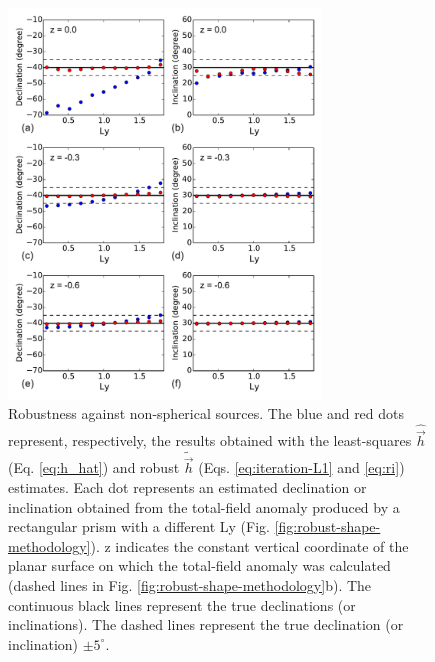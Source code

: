 \documentclass[journal abbreviation, npg]{copernicus}
\begin{document}
\begin{figure}[t]
\vspace*{2mm}
\begin{center}
\includegraphics[width=8.3cm]{Figures/Fig6.pdf}
\end{center}
\caption{Robustness against non-spherical sources. The blue and red dots represent, respectively, the results obtained with the least-squares $\hat{\vec{h}}$ (Eq. \ref{eq:h_hat}) and robust $\tilde{\vec{h}}$ (Eqs. \ref{eq:iteration-L1} and \ref{eq:ri}) estimates. Each dot represents an estimated declination or inclination obtained from the total-field anomaly produced by a rectangular prism with a different Ly (Fig. \ref{fig:robust-shape-methodology}). z indicates the constant vertical coordinate of the planar surface on which the total-field anomaly was calculated (dashed lines in Fig. \ref{fig:robust-shape-methodology}b). The continuous black lines represent the true declinations (or inclinations). The dashed lines represent the true declination (or inclination) $\pm 5^{\circ}$.} 
\label{fig:robust-shape-results}
\end{figure}

\end{document}
